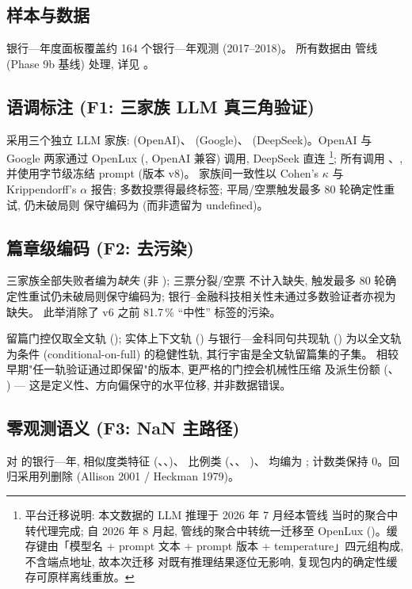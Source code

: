 \subsection{样本与数据}
银行—年度面板覆盖约 164 个银行—年观测 (2017--2018)。
所有数据由  管线 (Phase 9b 基线) 处理,
详见 。

\subsection{语调标注 (F1: 三家族 LLM 真三角验证)}
采用三个独立 LLM 家族:  (OpenAI)、
 (Google)、
(DeepSeek)。OpenAI 与 Google 两家通过 OpenLux
(, OpenAI 兼容) 调用, DeepSeek 直连
\footnote{平台迁移说明: 本文数据的 LLM 推理于 2026 年 7 月经本管线
当时的聚合中转代理完成; 自 2026 年 8 月起, 管线的聚合中转统一迁移至
OpenLux ()。缓存键由「模型名 + prompt
文本 + prompt 版本 + temperature」四元组构成, 不含端点地址, 故本次迁移
对既有推理结果逐位无影响, 复现包内的确定性缓存可原样离线重放。}; 所有调用 、,
并使用字节级冻结 prompt (版本 v8)。
家族间一致性以 Cohen's $\kappa$ 与 Krippendorff's $\alpha$ 报告;
多数投票得最终标签; 平局/空票触发最多 80 轮确定性重试, 仍未破局则
保守编码为 (而非遗留为 undefined)。

\subsection{篇章级编码 (F2: 去污染)}
三家族全部失败者编为\emph{缺失} (非 ); 三票分裂/空票
不计入缺失, 触发最多 80 轮确定性重试仍未破局则保守编码为;
银行--金融科技相关性未通过多数验证者亦视为缺失。
此举消除了 v6 之前 81.7\,\% ``中性'' 标签的污染。

留篇门控仅取全文轨 (); 实体上下文轨
() 与银行—金科同句共现轨 () 为以全文轨为条件
(conditional-on-full) 的稳健性轨, 其行宇宙是全文轨留篇集的子集。
相较早期"任一轨验证通过即保留"的版本, 更严格的门控会机械性压缩
 及派生份额 (、
) --- 这是定义性、方向偏保守的水平位移,
并非数据错误。

\subsection{零观测语义 (F3: NaN 主路径)}
对  的银行—年, 相似度类特征
(、、)、
比例类 (、、
)、 均编为
; 计数类保持 0。回归采用列删除 (Allison 2001 / Heckman 1979)。

